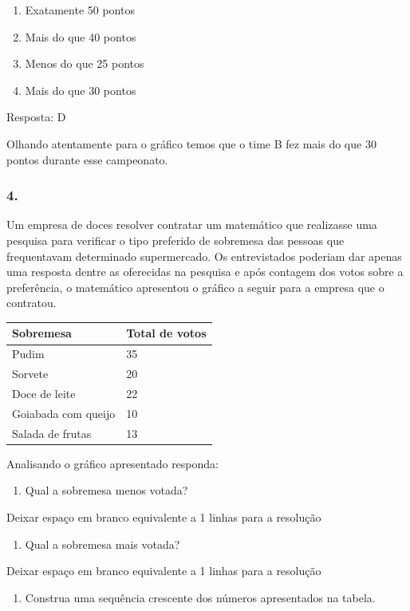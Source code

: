 \begin{enumerate}
\def\labelenumi{\alph{enumi})}
\item
  Exatamente 50 pontos
\item
  Mais do que 40 pontos
\item
  Menos do que 25 pontos
\item
  Mais do que 30 pontos
\end{enumerate}

Resposta: D

Olhando atentamente para o gráfico temos que o time B fez mais do que 30
pontos durante esse campeonato.

\subsubsection{4.}\label{section-94}

Um empresa de doces resolver contratar um matemático que realizasse uma
pesquisa para verificar o tipo preferido de sobremesa das pessoas que
frequentavam determinado supermercado. Os entrevistados poderiam dar
apenas uma resposta dentre as oferecidas na pesquisa e após contagem dos
votos sobre a preferência, o matemático apresentou o gráfico a seguir
para a empresa que o contratou.

\begin{longtable}[]{@{}ll@{}}
\toprule
Sobremesa & Total de votos\tabularnewline
\midrule
\endhead
Pudim & 35\tabularnewline
Sorvete & 20\tabularnewline
Doce de leite & 22\tabularnewline
Goiabada com queijo & 10\tabularnewline
Salada de frutas & 13\tabularnewline
\bottomrule
\end{longtable}

Analisando o gráfico apresentado responda:

\begin{enumerate}
\def\labelenumi{\alph{enumi})}
\item
  Qual a sobremesa menos votada?
\end{enumerate}

Deixar espaço em branco equivalente a 1 linhas para a resolução

\begin{enumerate}
\def\labelenumi{\alph{enumi})}
\item
  Qual a sobremesa mais votada?
\end{enumerate}

Deixar espaço em branco equivalente a 1 linhas para a resolução

\begin{enumerate}
\def\labelenumi{\alph{enumi})}
\item
  Construa uma sequência crescente dos números apresentados na tabela.
\end{enumerate}

